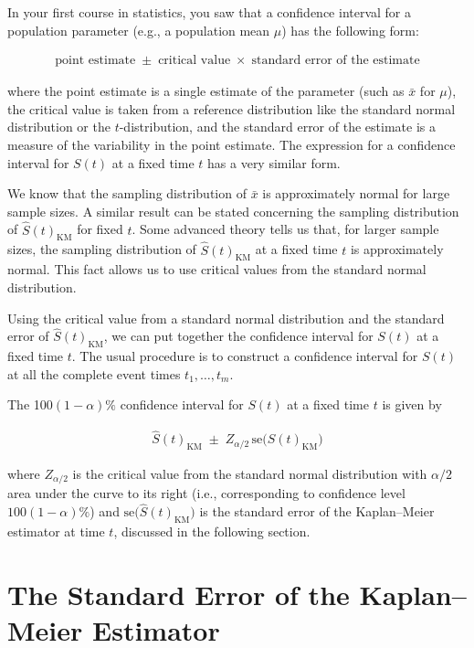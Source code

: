 \documentclass[
]{report}
\begin{document}
In your first course in statistics, you saw that a confidence interval for a population parameter (e.g., a population mean \(\mu\)) has the following form:

\begin{align}\label{9.6}
\text{point estimate} \;\pm\; \text{critical value}\;\times\;\text{standard error of the estimate}
\tag{9.6}
\end{align}

where the point estimate is a single estimate of the parameter (such as \(\bar x\) for \(\mu\)), the critical value is taken from a reference distribution like the standard normal distribution or the \(t\)-distribution, and the standard error of the estimate is a measure of the variability in the point estimate. The expression for a confidence interval for \(S(t)\) at a fixed time \(t\) has a very similar form.

We know that the sampling distribution of \(\bar x\) is approximately normal for large sample sizes. A similar result can be stated concerning the sampling distribution of \(\hat S(t)_{\mathrm{KM}}\) for fixed \(t\). Some advanced theory tells us that, for larger sample sizes, the sampling distribution of \(\hat S(t)_{\mathrm{KM}}\) at a fixed time \(t\) is approximately normal. This fact allows us to use critical values from the standard normal distribution.

Using the critical value from a standard normal distribution and the standard error of \(\hat S(t)_{\mathrm{KM}}\), we can put together the confidence interval for \(S(t)\) at a fixed time \(t\). The usual procedure is to construct a confidence interval for \(S(t)\) at all the complete event times \(t_1,\dots,t_m\).

The 100\((1-\alpha)\%\) confidence interval for \(S(t)\) at a fixed time \(t\) is given by

\begin{align}\label{9.7}
\hat S(t)_{\mathrm{KM}} \;\pm\; Z_{\alpha/2}\,\mathrm{se}\bigl(\hat S(t)_{\mathrm{KM}}\bigr)
\tag{9.7}
\end{align}

where \(Z_{\alpha/2}\) is the critical value from the standard normal distribution with \(\alpha/2\) area under the curve to its right (i.e., corresponding to confidence level \(100(1-\alpha)\%\)) and \(\mathrm{se}\bigl(\hat S(t)_{\mathrm{KM}}\bigr)\) is the standard error of the Kaplan--Meier estimator at time \(t\), discussed in the following section.

\section*{The Standard Error of the Kaplan--Meier Estimator}\label{the-standard-error-of-the-kaplanmeier-estimator}
\end{document}
